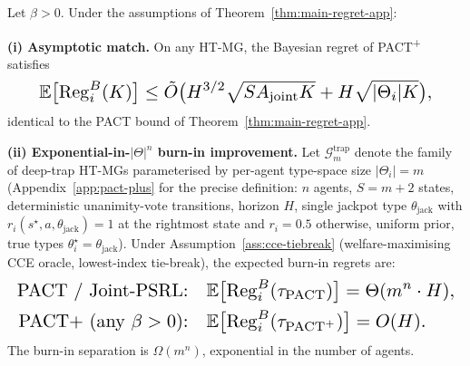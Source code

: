 \begin{theorem}
\label{thm:pact-plus-app}
Let $\beta > 0$. Under the assumptions of Theorem~\ref{thm:main-regret-app}:

\textbf{(i) Asymptotic match.} On any HT-MG, the Bayesian regret of PACT\textsuperscript{+} satisfies
\begin{equation}\resizebox{0.9\linewidth}{!}{$\displaystyle \mathbb{E}\big[\mathrm{Reg}_i^B(K)\big] \leq \tilde{O}\big(H^{3/2}\sqrt{S A_{\mathrm{joint}} K} + H\sqrt{|\Theta_i| K}\big), $}\end{equation}
identical to the PACT bound of Theorem~\ref{thm:main-regret-app}.

\textbf{(ii) Exponential-in-$|\Theta|^n$ burn-in improvement.} Let $\mathcal{G}_m^{\mathrm{trap}}$ denote the family of deep-trap HT-MGs parameterised by per-agent type-space size $|\Theta_i| = m$ (Appendix~\ref{app:pact-plus} for the precise definition: $n$ agents, $S = m+2$ states, deterministic unanimity-vote transitions, horizon $H$, single jackpot type $\theta_{\mathrm{jack}}$ with $r_i(s^\star, a, \theta_{\mathrm{jack}}) = 1$ at the rightmost state and $r_i = 0.5$ otherwise, uniform prior, true types $\theta_i^\star = \theta_{\mathrm{jack}}$). Under Assumption~\ref{ass:cce-tiebreak} (welfare-maximising CCE oracle, lowest-index tie-break), the expected burn-in regrets are:
\[\resizebox{\linewidth}{!}{$\displaystyle\begin{aligned}
\textnormal{PACT / Joint-PSRL:} \quad &\mathbb{E}\big[\mathrm{Reg}_i^B(\tau_{\textnormal{PACT}})\big] = \Theta(m^n \cdot H), \\
\textnormal{PACT\textsuperscript{+} (any } \beta > 0\textnormal{):} \quad &\mathbb{E}\big[\mathrm{Reg}_i^B(\tau_{\textnormal{PACT}^+})\big] = O(H).
\end{aligned}$}\]
The burn-in separation is $\Omega(m^n)$, exponential in the number of agents.
\end{theorem}

